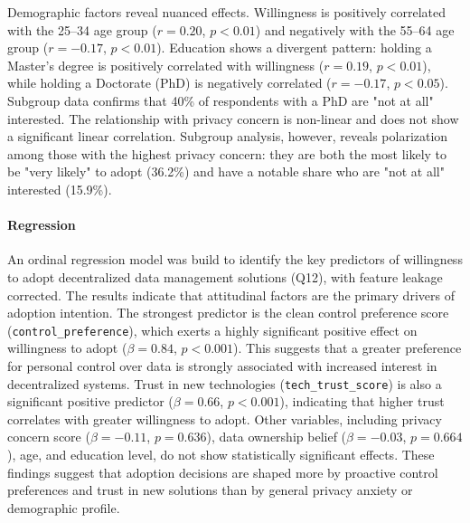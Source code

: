 	Demographic factors reveal nuanced effects. Willingness is positively correlated with the 25--34 age group ($r = 0.20$, $p < 0.01$) and negatively with the 55--64 age group ($r = -0.17$, $p < 0.01$). Education shows a divergent pattern: holding a Master's degree is positively correlated with willingness ($r = 0.19$, $p < 0.01$), while holding a Doctorate (PhD) is negatively correlated ($r = -0.17$, $p < 0.05$). Subgroup data confirms that 40\% of respondents with a PhD are "not at all" interested.
	The relationship with privacy concern is non-linear and does not show a significant linear correlation. Subgroup analysis, however, reveals polarization among those with the highest privacy concern: they are both the most likely to be "very likely" to adopt (36.2\%) and have a notable share who are "not at all" interested (15.9\%).

	\paragraph{Regression}
	An ordinal regression model was build to identify the key predictors of willingness to adopt decentralized data management solutions (Q12),	with feature leakage corrected. The results indicate that attitudinal factors are the primary drivers of adoption intention.
	The strongest predictor is the clean control preference score (\texttt{control\_preference}), which exerts a highly significant positive effect on willingness to adopt ($\beta = 0.84$, $p < 0.001$). This suggests that a greater preference for personal control over data is strongly associated with increased interest in decentralized systems. Trust in new technologies (\texttt{tech\_trust\_score}) is also a significant positive predictor ($\beta = 0.66$, $p < 0.001$), indicating that higher trust correlates with greater willingness to adopt.
	Other variables, including privacy concern score ($\beta = -0.11$, $p = 0.636$), data ownership belief ($\beta = -0.03$, $p = 0.664$), age, and education level, do not show statistically significant effects. These findings suggest that adoption decisions are shaped more by proactive control preferences and trust in new solutions than by general privacy anxiety or demographic profile.

